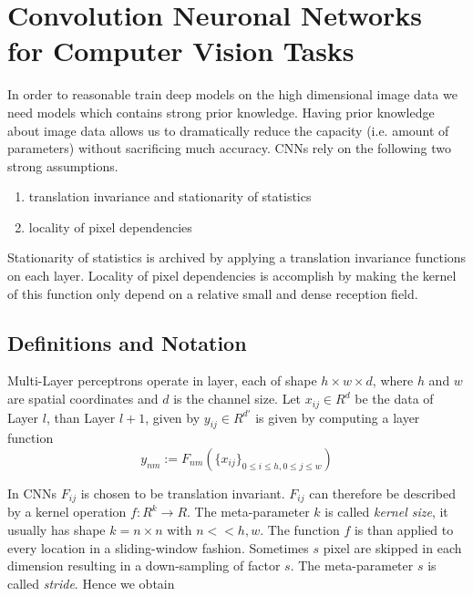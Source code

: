 \clearpage


\section{Convolution Neuronal Networks for Computer Vision Tasks}

In order to reasonable train deep models on the high dimensional image data we need models which contains strong prior knowledge. Having prior knowledge about image data allows us to dramatically reduce the capacity (i.e. amount of parameters) without sacrificing much accuracy. CNNs rely on the following two strong assumptions.

\begin{enumerate}
    \item translation invariance and stationarity of statistics
	\item locality of pixel dependencies
\end{enumerate}

Stationarity of statistics is archived by applying a translation invariance functions on each layer. Locality of pixel dependencies is accomplish by making the kernel of this function only depend on a relative small and dense reception field. 

\subsection{Definitions and Notation}

Multi-Layer perceptrons operate in layer, each of shape $h \times w \times d$, where $h$ and $w$ are spatial coordinates and $d$ is the channel size. Let $x_{ij} \in R^d$ be the data of Layer $l$, than Layer $l+1$, given by $y_{ij} \in R^{d'}$ is given by computing a layer function 
\begin{equation*}
y_{nm} := F_{nm} (\{ x_{ij} \}_{0 \leq i \leq h, 0 \leq j \leq w}   )
\end{equation*}

In CNNs $F_{ij}$ is chosen to be translation invariant. $F_{ij}$ can therefore be described by a kernel  operation $f: R^k \rightarrow R$. The meta-parameter $k$ is called \emph{kernel size}, it usually has shape $k = n \times n$ with $n << h,w$.  The function $f$ is than applied to every location in a sliding-window fashion. Sometimes $s$ pixel are skipped in each dimension resulting in a down-sampling of factor $s$. The meta-parameter $s$ is called \emph{stride}. Hence we obtain


